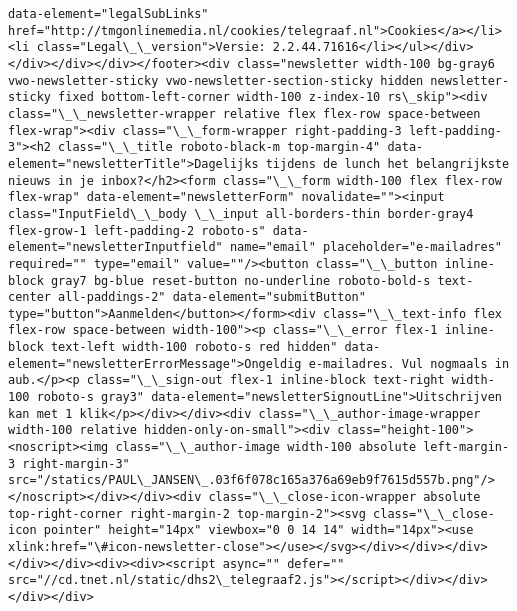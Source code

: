\documentclass[11pt]{article}
\begin{document}
\begin{Verbatim}[commandchars=\\\{\}]
data-element="legalSubLinks" href="http://tmgonlinemedia.nl/cookies/telegraaf.nl">Cookies</a></li><li class="Legal\_\_version">Versie: 2.2.44.71616</li></ul></div></div></div></div></footer><div class="newsletter width-100 bg-gray6 vwo-newsletter-sticky vwo-newsletter-section-sticky hidden newsletter-sticky fixed bottom-left-corner width-100 z-index-10 rs\_skip"><div class="\_\_newsletter-wrapper relative flex flex-row space-between flex-wrap"><div class="\_\_form-wrapper right-padding-3 left-padding-3"><h2 class="\_\_title roboto-black-m top-margin-4" data-element="newsletterTitle">Dagelijks tijdens de lunch het belangrijkste nieuws in je inbox?</h2><form class="\_\_form width-100 flex flex-row flex-wrap" data-element="newsletterForm" novalidate=""><input class="InputField\_\_body \_\_input all-borders-thin border-gray4 flex-grow-1 left-padding-2 roboto-s" data-element="newsletterInputfield" name="email" placeholder="e-mailadres" required="" type="email" value=""/><button class="\_\_button inline-block gray7 bg-blue reset-button no-underline roboto-bold-s text-center all-paddings-2" data-element="submitButton" type="button">Aanmelden</button></form><div class="\_\_text-info flex flex-row space-between width-100"><p class="\_\_error flex-1 inline-block text-left width-100 roboto-s red hidden" data-element="newsletterErrorMessage">Ongeldig e-mailadres. Vul nogmaals in aub.</p><p class="\_\_sign-out flex-1 inline-block text-right width-100 roboto-s gray3" data-element="newsletterSignoutLine">Uitschrijven kan met 1 klik</p></div></div><div class="\_\_author-image-wrapper width-100 relative hidden-only-on-small"><div class="height-100"><noscript><img class="\_\_author-image width-100 absolute left-margin-3 right-margin-3" src="/statics/PAUL\_JANSEN\_.03f6f078c165a376a69eb9f7615d557b.png"/></noscript></div></div><div class="\_\_close-icon-wrapper absolute top-right-corner right-margin-2 top-margin-2"><svg class="\_\_close-icon pointer" height="14px" viewbox="0 0 14 14" width="14px"><use xlink:href="\#icon-newsletter-close"></use></svg></div></div></div></div></div><div><div><script async="" defer="" src="//cd.tnet.nl/static/dhs2\_telegraaf2.js"></script></div></div></div></div>

    \end{Verbatim}
\end{document}
